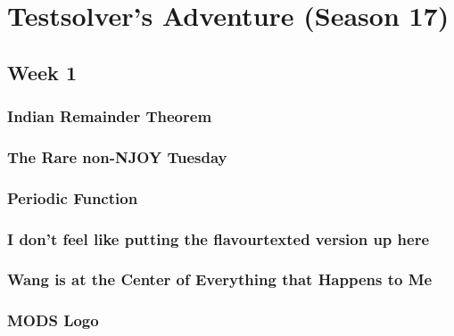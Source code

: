 \documentclass[titlepage=true]{scrartcl}
\begin{document}
{
\section{Testsolver's Adventure (Season 17)}

    \subsection{Week 1}

    \subsubsection{Indian Remainder Theorem}
    \label{17.1.1}
    
    \newpage

    \subsubsection{The Rare non-NJOY Tuesday}
	\label{17.1.2}
	
	\newpage

    \subsubsection{Periodic Function}
	\label{17.1.3}
	
	\newpage

    \subsubsection{I don't feel like putting the flavourtexted version up here}
	\label{17.1.4}
	
	\newpage
	
	\subsubsection{Wang is at the Center of Everything that Happens to Me}
	\label{17.1.5}
	
	\newpage

    \setcounter{subsubsection}{6}
	\subsubsection{MODS Logo}
	\label{17.1.7}
	
	\newpage
    
}
\end{document}
